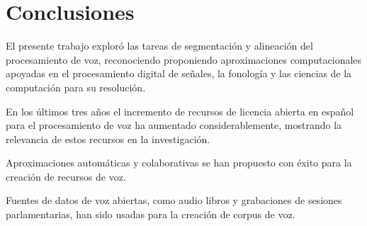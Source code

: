 \chapter{Conclusiones}

El presente trabajo exploró las tareas de segmentación y alineación del procesamiento de voz, reconociendo proponiendo aproximaciones computacionales apoyadas en el procesamiento digital de señales, la fonología y las ciencias de la computación para su resolución.

En los últimos tres años el incremento de recursos de licencia abierta en español para el procesamiento de voz ha aumentado considerablemente, mostrando la relevancia de estos recursos en la investigación.

Aproximaciones automáticas y colaborativas se han propuesto con éxito para la creación de recursos de voz.

Fuentes de datos de voz abiertas, como audio libros y grabaciones de sesiones parlamentarias, han sido usadas para la creación de corpus de voz.